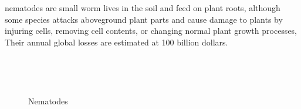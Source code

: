 nematodes are small worm lives in the soil and feed on plant roots, although some species attacks aboveground plant parts and cause damage to plants by injuring cells, removing cell contents, or changing normal plant growth processes, Their annual global losses are estimated at 100 billion dollars.\cite{book1}

\begin{figure}[!t]
\centering
\begin{minipage}{14cm}
    \centering
\end{minipage}
\\ \vspace{0.1cm}
\begin{minipage}{15cm}
    \centering
\end{minipage}
\\ \vspace{0.1cm}
\caption{Nematodes}
\label{fig:Nematodes}
\end{figure}

